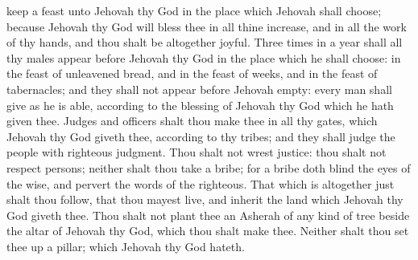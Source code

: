 keep a feast unto Jehovah thy God in the place which Jehovah shall choose; because Jehovah thy God will bless thee in all thine increase, and in all the work of thy hands, and thou shalt be altogether joyful. Three times in a year shall all thy males appear before Jehovah thy God in the place which he shall choose: in the feast of unleavened bread, and in the feast of weeks, and in the feast of tabernacles; and they shall not appear before Jehovah empty: every man shall give as he is able, according to the blessing of Jehovah thy God which he hath given thee.  Judges and officers shalt thou make thee in all thy gates, which Jehovah thy God giveth thee, according to thy tribes; and they shall judge the people with righteous judgment. Thou shalt not wrest justice: thou shalt not respect persons; neither shalt thou take a bribe; for a bribe doth blind the eyes of the wise, and pervert the words of the righteous. That which is altogether just shalt thou follow, that thou mayest live, and inherit the land which Jehovah thy God giveth thee.  Thou shalt not plant thee an Asherah of any kind of tree beside the altar of Jehovah thy God, which thou shalt make thee. Neither shalt thou set thee up a pillar; which Jehovah thy God hateth. 

